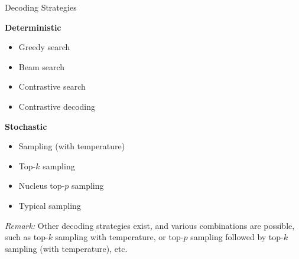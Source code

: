 
\begin{vbframe}{Decoding Strategies}



\textbf{Deterministic}
\begin{itemize}
    \item Greedy search
    \item Beam search
    \item Contrastive search 
    \item Contrastive decoding 
\end{itemize}

\textbf{Stochastic}
\begin{itemize}
    \item Sampling (with temperature) 
    \item Top-$k$ sampling 
    \item Nucleus top-$p$ sampling 
    \item Typical sampling 
\end{itemize}
\vspace{1ex}

\textit{Remark:} Other decoding strategies exist, and various combinations are possible, such as top-$k$ sampling with temperature, or top-$p$ sampling followed by top-$k$ sampling (with temperature), etc.
\end{vbframe}


\endlecture
